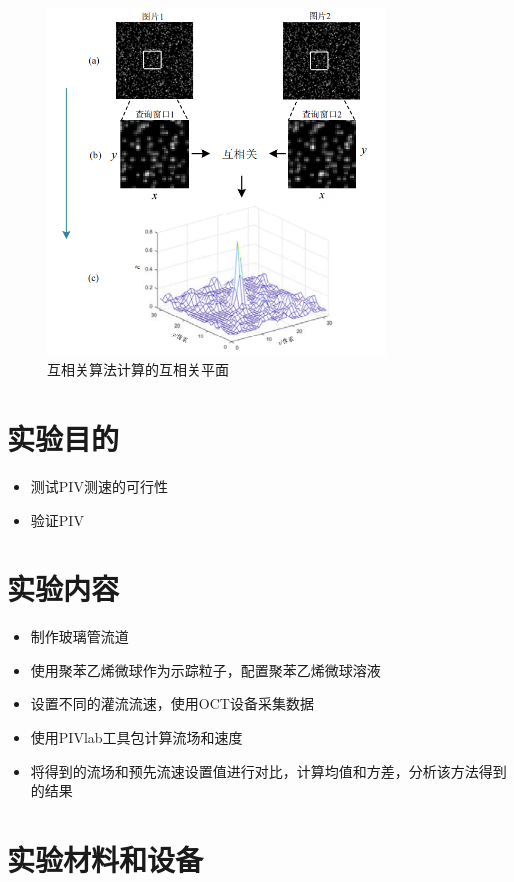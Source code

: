 \documentclass[12pt]{article}
\begin{document}
\begin{figure}[H]
    \centering
    \includegraphics[width=0.8\textwidth]{Images/互相关示意图.png}
    \caption{互相关算法计算的互相关平面}
\end{figure}

\section{实验目的}
\begin{itemize}
    \item 测试PIV测速的可行性
    \item 验证PIV
\end{itemize}

\section{实验内容}
\begin{itemize}
    \item 制作玻璃管流道
    \item 使用聚苯乙烯微球作为示踪粒子，配置聚苯乙烯微球溶液
    \item 设置不同的灌流流速，使用OCT设备采集数据
    \item 使用PIVlab工具包计算流场和速度
    \item 将得到的流场和预先流速设置值进行对比，计算均值和方差，分析该方法得到的结果
\end{itemize}

\section{实验材料和设备}
\end{document}
